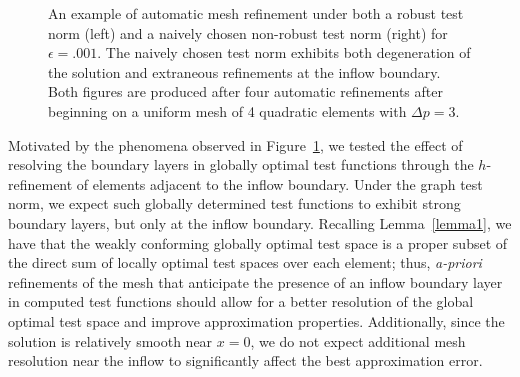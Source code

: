 \begin{figure}[!h]
\centering
{}
\caption{An example of automatic mesh refinement under both a robust test norm (left) and a naively chosen non-robust test norm (right) for $\epsilon = .001$.  The naively chosen test norm exhibits both degeneration of the solution and extraneous refinements at the inflow boundary.  Both figures are produced after four automatic refinements after beginning on a uniform mesh of 4 quadratic elements with $\Delta p=3$.}
\label{fig:nonRobustness}
\end{figure}

Motivated by the phenomena observed in Figure~\ref{fig:nonRobustness}, we tested the effect of resolving the boundary layers in globally optimal test functions through the $h$-refinement of elements adjacent to the inflow boundary.  Under the graph test norm, we expect such globally determined test functions to exhibit strong boundary layers, but only at the inflow boundary.  Recalling Lemma~\ref{lemma1}, we have that the weakly conforming globally optimal test space is a proper subset of the direct sum of locally optimal test spaces over each element; thus, \textit{a-priori} refinements of the mesh that anticipate the presence of an inflow boundary layer in computed test functions should allow for a better resolution of the global optimal test space and improve approximation properties.  Additionally, since the solution is relatively smooth near $x=0$, we do not expect additional mesh resolution near the inflow to significantly affect the best approximation error.  

